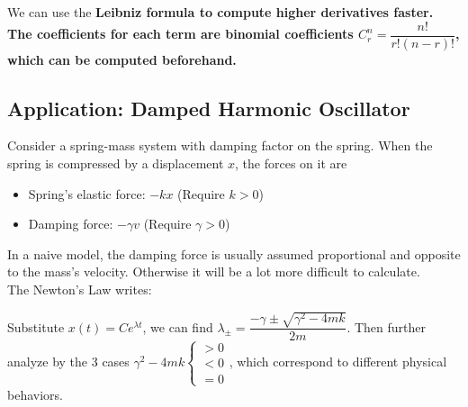 \documentclass[class=article, crop=false, 12pt]{standalone}
\begin{document}
\begin{notation}
    We can use the \bf{Leibniz formula} to compute higher derivatives faster.
    The coefficients for each term are binomial coefficients $C_r^n = \dfrac{n!}{r!(n-r)!}$, which can be computed beforehand.
\end{notation}


\subsection{Application: Damped Harmonic Oscillator}

Consider a spring-mass system with damping factor on the spring.
When the spring is compressed by a displacement $x$, the forces on it are
\begin{itemize}
    \item Spring's elastic force: $-kx$ (Require $k>0$)
    \item Damping force: $-\gamma v$ (Require $\gamma >0$)
\end{itemize}


In a naive model, the damping force is usually assumed proportional and opposite to the mass's velocity.
Otherwise it will be a lot more difficult to calculate.\\

The Newton's  Law writes:

Substitute $x(t) = Ce^{\lambda t}$, we can find $\lambda_\pm = \dfrac{-\gamma \pm \sqrt{\gamma^2-4mk}}{2m}$.
Then further analyze by the 3 cases 
$\gamma^2-4mk
\begin{cases}
    >0 \\ <0 \\ =0
\end{cases}
$,
which correspond to different physical behaviors.
\end{document}
